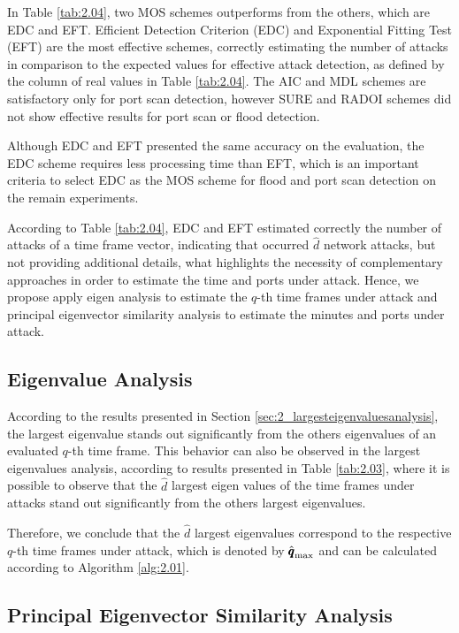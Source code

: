 In Table \ref{tab:2.04}, two MOS schemes outperforms from the others, which are EDC and EFT. Efficient Detection Criterion (EDC) and Exponential Fitting Test (EFT) are the most effective schemes, correctly estimating the number of attacks in comparison to the expected values for effective attack detection, as defined by the column of real values in Table \ref{tab:2.04}. The AIC and MDL schemes are satisfactory only for port scan detection, however SURE and RADOI schemes did not show effective results for port scan or flood detection.

Although EDC and EFT presented the same accuracy on the evaluation, the EDC scheme requires less processing time than EFT, which is an important criteria to select EDC as the MOS scheme for flood and port scan detection on the remain experiments.

According to Table \ref{tab:2.04}, EDC and EFT estimated correctly the number of attacks of a time frame vector, indicating that occurred $\hat{d}$ network attacks, but not providing additional details, what highlights the necessity of complementary approaches in order to estimate the time and ports under attack. Hence, we propose apply eigen analysis to estimate the $q$-th time frames under attack and principal eigenvector similarity analysis to estimate the minutes and ports under attack.

\subsection{Eigenvalue Analysis}
\label{sec:2_EigenvalueAnalysis}

According to the results presented in Section \ref{sec:2_largesteigenvaluesanalysis}, the largest eigenvalue stands out significantly from the others eigenvalues of an evaluated $q$-th time frame. This behavior can also be observed in the largest eigenvalues analysis, according to results presented in Table \ref{tab:2.03}, where it is possible to observe that the $\hat{d}$ largest eigen values of the time frames under attacks stand out significantly from the others largest eigenvalues. 

Therefore, we conclude that the $\hat{d}$ largest eigenvalues correspond to the respective $q$-th time frames under attack, which is denoted by $\rm{\hat{\pmb{q}}}_{\rm max}$ and can be calculated according to Algorithm \ref{alg:2.01}.

\subsection{Principal Eigenvector Similarity Analysis}
\label{sec:2_EigensimilarityAnalysis}

